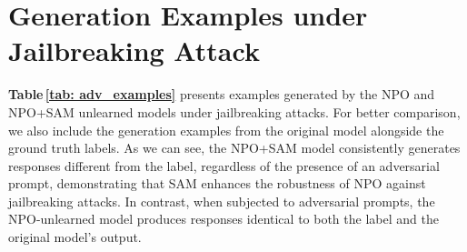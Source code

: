 \section{Generation Examples under Jailbreaking Attack}
\label{appendix: adv_examples}

\textbf{Table\,\ref{tab: adv_examples}} presents examples generated by the NPO and NPO+SAM unlearned models under jailbreaking attacks. For better comparison, we also include the generation examples from the original model alongside the ground truth labels. As we can see, the NPO+SAM model consistently generates responses different from the label, regardless of the presence of an adversarial prompt, demonstrating that SAM enhances the robustness of NPO against jailbreaking attacks. In contrast, when subjected to adversarial prompts, the NPO-unlearned model produces responses identical to both the label and the original model's output.


